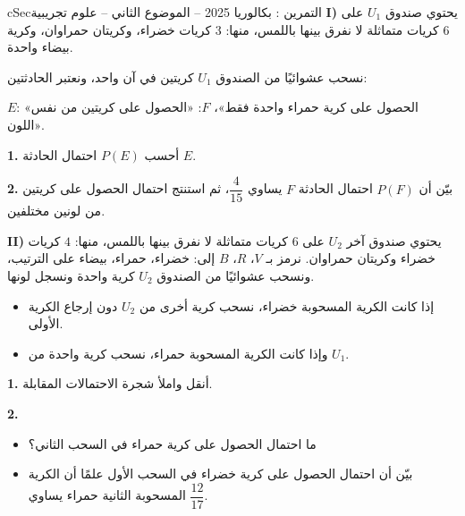\documentclass[12pt,a4paper]{article}
\newenvironment{BOX}[2]{\begin{otherlanguage}{english}\begin{arbox}{#1}{#2}}{\end{arbox}\end{otherlanguage}}
\newcounter{exo}
\newenvironment{tamrin}[1]{\stepcounter{exo}\begin{BOX}{cSec}{التمرين \theexo: #1}}{\end{BOX}}
\newenvironment{LTR}{\begin{otherlanguage}{english}}{\end{otherlanguage}}
\renewcommand{\ldots}{\mathinner{\ldotp\ldotp\ldotp}}
\newenvironment{sq}{\begin{itemize}[leftmargin=2.4em,itemsep=3pt]}{\end{itemize}}
\newcommand{\qa}{\item[(أ)]}\newcommand{\qb}{\item[(ب)]}\newcommand{\qc}{\item[(جـ)]}\newcommand{\qd}{\item[(د)]}\newcommand{\qe}{\item[(هـ)]}
\newcommand{\QQ}[1]{\par\smallskip\textbf{#1.} }
\begin{document}
\begin{tamrin}{بكالوريا 2025 -- الموضوع الثاني -- علوم تجريبية}
\textbf{I)} يحتوي صندوق $U_1$ على $6$ كريات متماثلة لا نفرق بينها باللمس، منها: $3$ كريات خضراء، وكريتان حمراوان، وكرية بيضاء واحدة.

نسحب عشوائيًا من الصندوق $U_1$ كريتين في آن واحد، ونعتبر الحادثتين:

$E$: «الحصول على كرية حمراء واحدة فقط»، \quad $F$: «الحصول على كريتين من نفس اللون».
\QQ{1} أحسب $P(E)$ احتمال الحادثة $E$.
\QQ{2} بيّن أن $P(F)$ احتمال الحادثة $F$ يساوي $\dfrac{4}{15}$، ثم استنتج احتمال الحصول على كريتين من لونين مختلفين.

\textbf{II)} يحتوي صندوق آخر $U_2$ على $6$ كريات متماثلة لا نفرق بينها باللمس، منها: $4$ كريات خضراء وكريتان حمراوان.
نرمز بـ $V$، $R$، $B$ إلى: خضراء، حمراء، بيضاء على الترتيب، ونسحب عشوائيًا من الصندوق $U_2$ كرية واحدة ونسجل لونها.
\begin{itemize}
\item إذا كانت الكرية المسحوبة خضراء، نسحب كرية أخرى من $U_2$ دون إرجاع الكرية الأولى.
\item وإذا كانت الكرية المسحوبة حمراء، نسحب كرية واحدة من $U_1$.
\end{itemize}
\begin{center}\begin{LTR}\end{LTR}\end{center}
\QQ{1} أنقل واملأ شجرة الاحتمالات المقابلة.
\QQ{2}
\begin{sq}
\qa ما احتمال الحصول على كرية حمراء في السحب الثاني؟
\qb بيّن أن احتمال الحصول على كرية خضراء في السحب الأول علمًا أن الكرية المسحوبة الثانية حمراء يساوي $\dfrac{12}{17}$.
\end{sq}
\end{tamrin}
\end{document}
